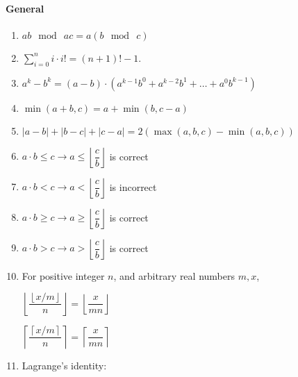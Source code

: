 \begin{enumerate}

            \end{enumerate}
\paragraph{General}\begin{enumerate}

            \item $\displaystyle ab \mod\ ac=a(b \mod\ c)$
            \item $\displaystyle \sum_{i = 0}^n{i\cdot i!=(n + 1)! - 1}$.
            \item $\displaystyle a^k - b^k = (a - b) \cdot (a^{k - 1}b^0 + a^{k - 2}b^1 + … + a^0b^{k - 1})$
            \item $\displaystyle \min(a + b, c) = a + \min(b, c - a)$
            \item $|a - b| + |b - c| + |c - a| = 2 (\max (a, b, c) - \min (a, b, c))$
            \item $\displaystyle a \cdot b \leq c \rightarrow a \leq \left \lfloor \dfrac{c}{b} \right \rfloor$ is correct
            
            \item $\displaystyle a \cdot b < c \rightarrow a < \left \lfloor \dfrac{c}{b} \right \rfloor$ is
                incorrect
            
            \item $\displaystyle a \cdot b \geq c \rightarrow a \geq \left \lfloor \dfrac{c}{b} \right \rfloor$ is correct
            
            \item $\displaystyle a \cdot b > c \rightarrow a > \left \lfloor \dfrac{c}{b} \right \rfloor$ is correct
            
            \item 
                For positive integer $n$, and arbitrary real numbers $m,x$,

                $\displaystyle \left \lfloor \dfrac{\left \lfloor x/m \right \rfloor}{n} \right \rfloor = \left
                    \lfloor
                    \dfrac{x}{mn} \right \rfloor$

                $\displaystyle \left \lceil \dfrac{\left \lceil x/m \right \rceil}{n} \right \rceil = \left \lceil
                    \dfrac{x}{mn} \right \rceil$

            
            \item 
                Lagrange’s identity:


\end{enumerate}
